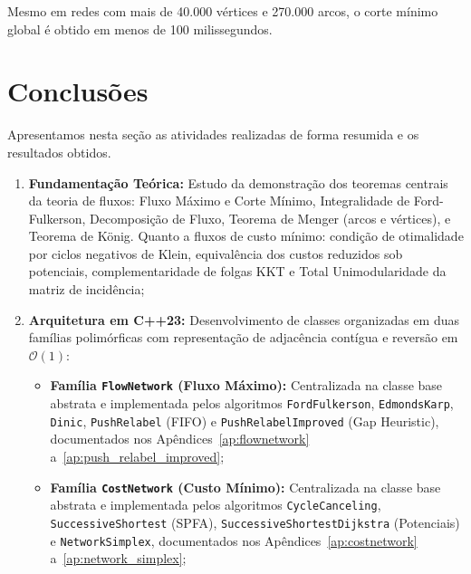 \documentclass[12pt,a4paper]{article}
\newcounter{teorema}
\begin{document}
Mesmo em redes com mais de 40.000 vértices e 270.000 arcos, o corte mínimo global é obtido em menos de 100 milissegundos.

\section{Conclusões}\label{sec:conclusoes}

Apresentamos nesta seção as atividades realizadas de forma resumida e os resultados obtidos.

\begin{enumerate}[leftmargin=1.5em, itemsep=0.2em, topsep=0.2em, parsep=0em]
    \item \textbf{Fundamentação Teórica:} Estudo da demonstração dos teoremas centrais da teoria de fluxos: Fluxo Máximo e Corte Mínimo, Integralidade de Ford-Fulkerson, Decomposição de Fluxo, Teorema de Menger (arcos e vértices), e Teorema de König. Quanto a fluxos de custo mínimo: condição de otimalidade por ciclos negativos de Klein, equivalência dos custos reduzidos sob potenciais, complementaridade de folgas KKT e Total Unimodularidade da matriz de incidência;

    \item \textbf{Arquitetura em C++23:} Desenvolvimento de classes organizadas em duas famílias polimórficas com representação de adjacência contígua e reversão em $\mathcal{O}(1)$:
    \begin{itemize}[leftmargin=1.5em, itemsep=0.1em, topsep=0.1em, parsep=0em]
    \raggedright
        \item \textbf{Família \lstinline{FlowNetwork} (Fluxo Máximo):} Centralizada na classe base abstrata e implementada pelos algoritmos \lstinline{FordFulkerson}, \lstinline{EdmondsKarp}, \lstinline{Dinic}, \lstinline{PushRelabel} (FIFO) e \lstinline{PushRelabelImproved} (Gap Heuristic), documentados nos Apêndices~\ref{ap:flownetwork} a~\ref{ap:push_relabel_improved};
        \item \textbf{Família \lstinline{CostNetwork} (Custo Mínimo):} Centralizada na classe base abstrata e implementada pelos algoritmos \lstinline{CycleCanceling}, \lstinline{SuccessiveShortest} (SPFA), \lstinline{SuccessiveShortestDijkstra} (Potenciais) e \lstinline{NetworkSimplex}, documentados nos Apêndices~\ref{ap:costnetwork} a~\ref{ap:network_simplex};
    \end{itemize}


\end{enumerate}
\end{document}
